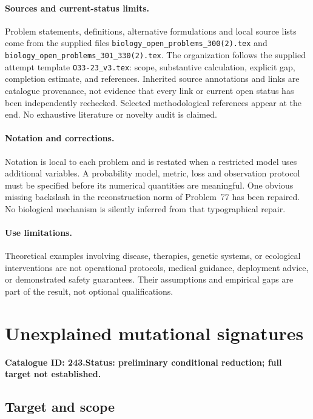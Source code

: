 \documentclass[11pt]{article}
\begin{document}
\paragraph{Sources and current-status limits.}
Problem statements, definitions, alternative formulations and local source lists
come from the supplied files
\texttt{biology\_open\_problems\_300(2).tex} and
\texttt{biology\_open\_problems\_301\_330(2).tex}.
The organization follows the supplied attempt template
\texttt{O33-23\_v3.tex}: scope, substantive calculation, explicit gap,
completion estimate, and references. Inherited source annotations and links are
catalogue provenance, not evidence that every link or current open status has
been independently rechecked. Selected methodological references appear at the
end. No exhaustive literature or novelty audit is claimed.

\paragraph{Notation and corrections.}
Notation is local to each problem and is restated when a restricted model uses
additional variables. A probability model, metric, loss and observation protocol
must be specified before its numerical quantities are meaningful. One obvious
missing backslash in the reconstruction norm of Problem~77 has been repaired.
No biological mechanism is silently inferred from that typographical repair.

\paragraph{Use limitations.}
Theoretical examples involving disease, therapies, genetic systems, or ecological
interventions are not operational protocols, medical guidance, deployment advice,
or demonstrated safety guarantees. Their assumptions and empirical gaps are part
of the result, not optional qualifications.

\setcounter{section}{242}
\section{Unexplained mutational signatures}
\label{prob:243}
\noindent\textbf{Catalogue ID: 243.}\quad \textbf{Status: preliminary conditional reduction; full target not established.}
\subsection{Target and scope}
\end{document}
